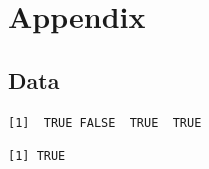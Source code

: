 \documentclass[
  letterpaper,
  DIV=11,
  numbers=noendperiod]{scrartcl}
\begin{document}
\renewcommand{\bibsection}{}


\setcounter{section}{0}
\renewcommand{\thesection}{\Alph{section}}

\setcounter{table}{0}
\renewcommand{\thetable}{A\arabic{table}}

\setcounter{figure}{0}
\renewcommand{\thefigure}{A\arabic{figure}}

\newpage

\section{Appendix}\label{appendix}

\subsection{Data}\label{data}

\begin{verbatim}
[1]  TRUE FALSE  TRUE  TRUE
\end{verbatim}

\begin{verbatim}
[1] TRUE
\end{verbatim}
\end{document}
